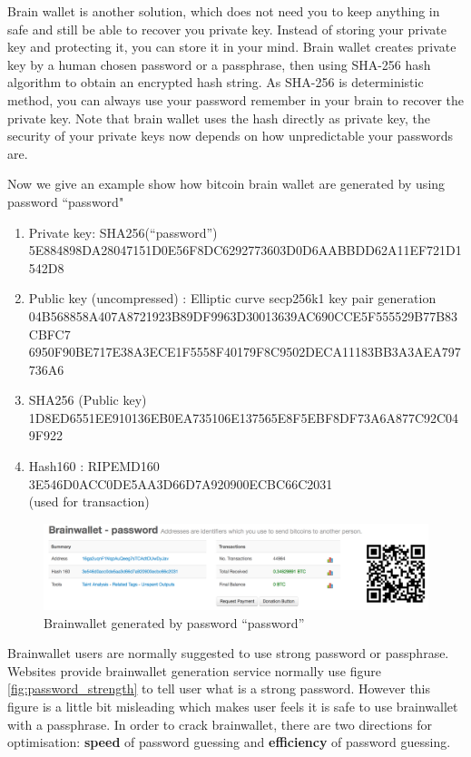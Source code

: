 Brain wallet is another solution, which does not need you to keep anything in safe and still be able to recover you private key. Instead of storing your private key and protecting it, you can store it in your mind. Brain wallet creates private key by a human chosen password or a passphrase, then using SHA-256 hash algorithm to obtain an encrypted hash string. As SHA-256 is deterministic method, you can always use your password remember in your brain to recover the private key. Note that brain wallet uses the hash directly as private key, the security of your private keys now depends on how unpredictable your passwords are. 

Now we give an example show how bitcoin brain wallet are generated by using password ``password"
\begin{enumerate}
	\item Private key: SHA256(``password'') \\ 5E884898DA28047151D0E56F8DC6292773603D0D6AABBDD62A11EF721D1542D8
	\item Public key (uncompressed) : Elliptic curve secp256k1 key pair generation \\ 04B568858A407A8721923B89DF9963D30013639AC690CCE5F555529B77B83CBFC7\\6950F90BE717E38A3ECE1F5558F40179F8C9502DECA11183BB3A3AEA797736A6
	\item SHA256 (Public key) \\
	1D8ED6551EE910136EB0EA735106E137565E8F5EBF8DF73A6A877C92C049F922
	\item Hash160 : RIPEMD160 \\
	3E546D0ACC0DE5AA3D66D7A920900ECBC66C2031\\
	(used for transaction)
\end{enumerate}

 \begin{figure}[h!]
 	\centering
 	\includegraphics[width=140mm]{./pics/brainwallet-password.png}
 	\caption{Brainwallet generated by password ``password''}
 	\label{fig:brainwallet_password}
 \end{figure}
 
Brainwallet users are normally suggested to use strong password or passphrase. Websites provide brainwallet generation service normally use  figure \ref{fig:password_strength} to tell user what is a strong password. However this figure is a little bit misleading which makes user feels it is safe to use brainwallet with a passphrase. In order to crack brainwallet, there are two directions for optimisation: \textbf{speed} of password guessing and \textbf{efficiency} of password guessing. 

